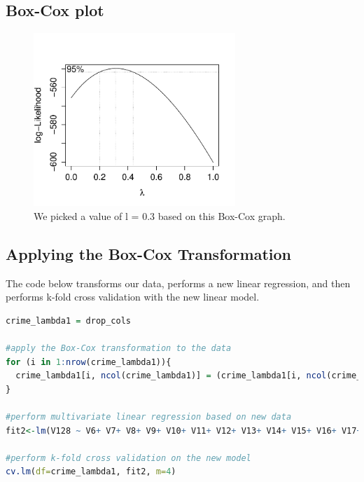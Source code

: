 \documentclass{article}
\begin{document}
\subsection{Box-Cox plot}
\begin{figure}[H]
\centering
\includegraphics[width=3.0in]{boxcox.pdf}
\caption{We picked a value of l = 0.3 based on this Box-Cox graph. }\label{fig_container} 
\end{figure}

\subsection{Applying the Box-Cox Transformation}
The code below transforms our data, performs a new linear regression, and then performs k-fold cross validation with the new linear model. 

\begin{lstlisting}[language=r]
crime_lambda1 = drop_cols

#apply the Box-Cox transformation to the data
for (i in 1:nrow(crime_lambda1)){
  crime_lambda1[i, ncol(crime_lambda1)] = (crime_lambda1[i, ncol(crime_lambda1)]^0.3-1)/0.3
}

#perform multivariate linear regression based on new data
fit2<-lm(V128 ~ V6+ V7+ V8+ V9+ V10+ V11+ V12+ V13+ V14+ V15+ V16+ V17+ V18+ V19+ V20+ V21+ V22+ V23+ V24+ V25+ V26+ V27+ V28+ V29+ V30+ V32+ V33+ V34+ V35+ V36+ V37+ V38+ V39+ V40+ V41+ V42+ V43+ V44+ V45+ V46+ V47+ V48+ V49+ V50+ V51+ V52+ V53+ V54+ V55+ V56+ V57+ V58+ V59+ V60+ V61+ V62+ V63+ V64+ V65+ V66+ V67+ V68+ V69+ V70+ V71+ V72+ V73+ V74+ V75+ V76+ V77+ V78+ V79+ V80+ V81+ V82+ V83+ V84+ V85+ V86+ V87+ V88+ V89+ V90+ V91+ V92+ V93+ V94+ V95+ V96+ V97+ V98+ V99+ V100+ V101+ V119+ V120+ V121+ V126, data=crime_lambda1)

#perform k-fold cross validation on the new model
cv.lm(df=crime_lambda1, fit2, m=4)
\end{lstlisting}
\end{document}
